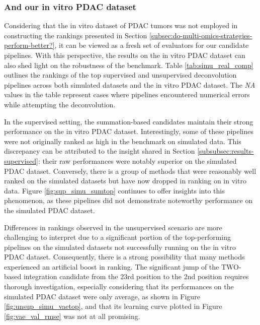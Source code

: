 \documentclass{article}
\begin{document}


\subsubsection{And our in vitro PDAC dataset}

Considering that the in vitro dataset of PDAC tumors was not employed in constructing the rankings presented in Section \ref{subsec:do-multi-omics-strategies-perform-better?}, it can be viewed as a fresh set of evaluators for our candidate pipelines.
With this perspective, the results on the in vitro PDAC dataset can also shed light on the robustness of the benchmark.
Table \ref{tab:simu_real_comp} outlines the rankings of the top supervised and unsupervised deconvolution pipelines across both simulated datasets and the in vitro PDAC dataset.
The \textit{NA} values in the table represent cases where pipelines encountered numerical errors while attempting the deconvolution.

In the supervised setting, the summation-based candidates maintain their strong performance on the in vitro PDAC dataset.
Interestingly, some of these pipelines were not originally ranked as high in the benchmark on simulated data.
This discrepancy can be attributed to the insight shared in Section \ref{subsubsec:results-supervised}: their raw performances were notably superior on the simulated PDAC dataset.
Conversely, there is a group of methods that were reasonably well ranked on the simulated datasets but have now dropped in ranking on in vitro data.
Figure \ref{fig:sup_simu_sumtop} continues to offer insights into this phenomenon, as these pipelines did not demonstrate noteworthy performance on the simulated PDAC dataset.

Differences in rankings observed in the unsupervised scenario are more challenging to interpret due to a significant portion of the top-performing pipelines on the simulated datasets not successfully running on the in vitro PDAC dataset.
Consequently, there is a strong possibility that many methods experienced an artificial boost in ranking.
The significant jump of the TWO-based integration candidate from the 23rd position to the 2nd position requires thorough investigation, especially considering that its performances on the simulated PDAC dataset were only average, as shown in Figure \ref{fig:unsup_simu_vaetop}, and that its learning curve plotted in Figure \ref{fig:vae_val_rmse} was not at all promising.


\end{document}
